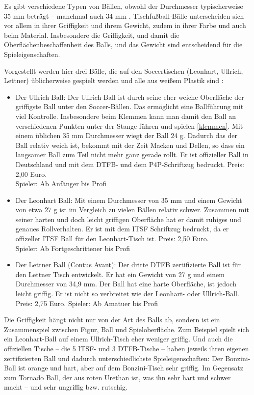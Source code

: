 Es gibt verschiedene Typen von Bällen, obwohl der Durchmesser typischerweise 35 mm beträgt -- manchmal auch 34 mm \citep{www:kickerbau:baelle}.
Tischfußball-Bälle unterscheiden sich vor allem in ihrer Griffigkeit und ihrem Gewicht, zudem in ihrer Farbe und auch beim Material.
Insbesondere die Griffigkeit, und damit die Oberflächenbeschaffenheit des Balls, und das Gewicht sind entscheidend für die Spieleigenschaften.  

Vorgestellt werden hier drei Bälle, die auf den Soccertischen (Leonhart, Ullrich, Lettner) üblicherweise gespielt werden und alle aus weißem Plastik sind \citep{www:tfc-reutlingen}:
\begin{itemize}
\item Der Ullrich Ball:
Der Ullrich Ball ist durch seine eher weiche Oberfläche der griffigste Ball unter den Soccer-Bällen. 
Das ermöglicht eine Ballführung mit viel Kontrolle. Insbesondere beim Klemmen kann man damit den Ball an verschiedenen Punkten unter der Stange führen und spielen \ref{klemmen}.
Mit einem üblichen 35 mm Durchmesser wiegt der Ball 24 g.
Dadurch das der Ball relativ weich ist, bekommt mit der Zeit Macken und Dellen, so dass ein langsamer Ball zum Teil nicht mehr ganz gerade rollt.
Er ist offizieller Ball in Deutschland und mit dem DTFB- und dem P4P-Schriftzug bedruckt.
Preis: 2,00 Euro. \\
Spieler: Ab Anfänger bis Profi
\item Der Leonhart Ball: 
Mit einem Durchmesser von 35 mm und einem Gewicht von etwa 27 g ist im Vergleich zu vielen Bällen relativ schwer. 
Zusammen mit seiner harten und doch leicht griffigen Oberfläche hat er damit ruhiges und genaues Rollverhalten.
Er ist mit dem ITSF Schriftzug bedruckt, da er offizeller ITSF Ball für den Leonhart-Tisch ist.
Preis: 2,50 Euro. \\
Spieler: Ab Fortgeschrittener bis Profi
\item Der Lettner Ball (Contus Avant):
Der dritte DTFB zertifizierte Ball ist für den Lettner Tisch entwickelt.
Er hat ein Gewicht von 27 g und einem Durchmesser von 34,9 mm.
Der Ball hat eine harte Oberfläche, ist jedoch leicht griffig. 
Er ist nicht so verbreitet wie der Leonhart- oder Ullrich-Ball. \\
Preis: 2,75 Euro.
Spieler: Ab Amatuer bis Profi
\end{itemize}

Die Griffigkeit hängt nicht nur von der Art des Balls ab, sondern ist ein Zusammenspiel zwischen Figur, Ball und Spieloberfläche. 
Zum Beispiel spielt sich ein Leonhart-Ball auf einem Ullrich-Tisch eher weniger griffig.  
Und auch die offiziellen Tische -- die 5 ITSF- und 3 DTFB-Tische -- haben jeweils ihren eigenen zertifizierten Ball und dadurch unterschiedlichste Spieleigenschaften:
Der Bonzini-Ball ist orange und hart, aber auf dem Bonzini-Tisch sehr griffig. 
Im Gegensatz zum Tornado Ball, der aus roten Urethan ist, was ihn sehr hart und schwer macht -- und sehr ungriffig bzw. rutschig. 




